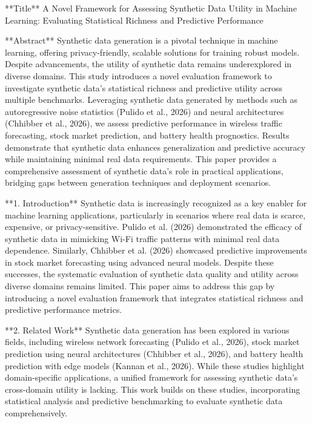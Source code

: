 **Title**  
A Novel Framework for Assessing Synthetic Data Utility in Machine Learning: Evaluating Statistical Richness and Predictive Performance  

**Abstract**  
Synthetic data generation is a pivotal technique in machine learning, offering privacy-friendly, scalable solutions for training robust models. Despite advancements, the utility of synthetic data remains underexplored in diverse domains. This study introduces a novel evaluation framework to investigate synthetic data's statistical richness and predictive utility across multiple benchmarks. Leveraging synthetic data generated by methods such as autoregressive noise statistics (Pulido et al., 2026) and neural architectures (Chhibber et al., 2026), we assess predictive performance in wireless traffic forecasting, stock market prediction, and battery health prognostics. Results demonstrate that synthetic data enhances generalization and predictive accuracy while maintaining minimal real data requirements. This paper provides a comprehensive assessment of synthetic data's role in practical applications, bridging gaps between generation techniques and deployment scenarios.  

**1. Introduction**  
Synthetic data is increasingly recognized as a key enabler for machine learning applications, particularly in scenarios where real data is scarce, expensive, or privacy-sensitive. Pulido et al. (2026) demonstrated the efficacy of synthetic data in mimicking Wi-Fi traffic patterns with minimal real data dependence. Similarly, Chhibber et al. (2026) showcased predictive improvements in stock market forecasting using advanced neural models. Despite these successes, the systematic evaluation of synthetic data quality and utility across diverse domains remains limited. This paper aims to address this gap by introducing a novel evaluation framework that integrates statistical richness and predictive performance metrics.  

**2. Related Work**  
Synthetic data generation has been explored in various fields, including wireless network forecasting (Pulido et al., 2026), stock market prediction using neural architectures (Chhibber et al., 2026), and battery health prediction with edge models (Kannan et al., 2026). While these studies highlight domain-specific applications, a unified framework for assessing synthetic data's cross-domain utility is lacking. This work builds on these studies, incorporating statistical analysis and predictive benchmarking to evaluate synthetic data comprehensively.  

